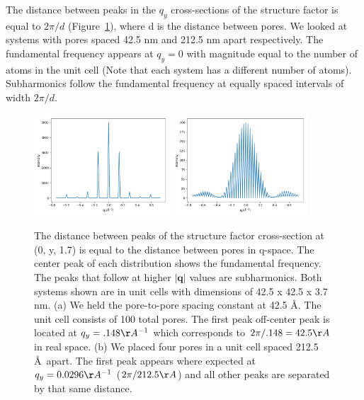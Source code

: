 \documentclass{article}
\begin{document}
  The distance between peaks in the $q_y$ cross-sections of the structure
  factor is equal to $2\pi / d$ (Figure~\ref{fig:p2p_rpi}), where d is the
  distance between pores. We looked at systems with pores spaced 42.5 nm and
  212.5 nm apart respectively. The fundamental frequency appears at $q_y=0$ with
  magnitude equal to the number of atoms in the unit cell (Note that each system
  has a different number of atoms). Subharmonics follow the fundamental frequency
  at equally spaced intervals of width $2\pi / d$. 

  \begin{figure}[!htb]
  \centering
  \includegraphics[width=0.45\textwidth]{constant_p2p.png}
  \includegraphics[width=0.45\textwidth]{constant_npores.png}
  \caption{The distance between peaks of the structure factor cross-section at
  (0, y, 1.7) is equal to the distance between pores in q-space. The center 
  peak of each distribution shows the fundamental frequency. The peaks
  that follow at higher $\left|\mathbf{q}\right|$ values are subharmonics. Both systems
  shown are in unit cells with dimensions of 42.5 x 42.5 x 3.7 nm. (a) We held
  the pore-to-pore spacing constant at 42.5 \AA. The unit cell consists of 100
  total pores. The first peak off-center peak is located at $q_y = .148 \AA^{-1}$
  which corresponds to $2\pi / .148 = 42.5 \AA$ in real space. (b) We placed four
  pores in a unit cell spaced 212.5 \AA~apart. The first peak appears where
  expected at $q_y = 0.0296 \AA^{-1}$ ($2\pi / 212.5 \AA$) and all other peaks
  are separated by that same distance.
  }\label{fig:p2p_rpi}
  \end{figure}
\end{document}
